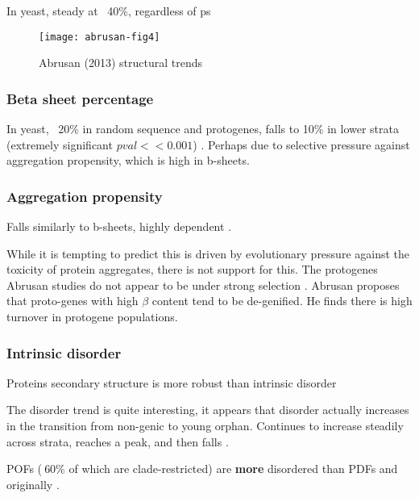         In yeast, steady at ~40\%, regardless of ps
        \cite{abrusan_integration_2013} 

        \begin{figure}[!hbpt] \centering
            \texttt{[image: abrusan-fig4]} \caption{Abrusan
            (2013) structural trends} \end{figure} \FloatBarrier


    \subsubsection{Beta sheet percentage}

        In yeast, ~20\% in random sequence and protogenes, falls to 10\% in
        lower strata (extremely significant $pval << 0.001$)
        \cite{abrusan_integration_2013}. Perhaps due to selective pressure
        against aggregation propensity, which is high in b-sheets.

    \subsubsection{Aggregation propensity}

        Falls similarly to b-sheets, highly dependent
        \cite{abrusan_integration_2013}.

        While it is tempting to predict this is driven by evolutionary
        pressure against the toxicity of protein aggregates, there is not
        support for this. The protogenes Abrusan studies do not appear to
        be under strong selection \cite{carvunis_proto-genes_2012}. Abrusan
        proposes that proto-genes with high $\beta$ content tend to be
        de-genified. He finds there is high turnover in protogene
        populations.

    \subsubsection{Intrinsic disorder}

        Proteins secondary structure is more robust than intrinsic disorder
        \cite{schaefer_protein_2010}

        The disorder trend is quite interesting, it appears that disorder
        actually increases in the transition from non-genic to young
        orphan. Continues to increase steadily across strata, reaches a
        peak, and then falls \cite{carvunis_proto-genes_2012}.

        POFs ($~$60\% of which are clade-restricted) are \textbf{more}
        disordered than PDFs \cite[review]{gollery_pofs:_2007} and
        originally \cite{gollery_what_2006}.

